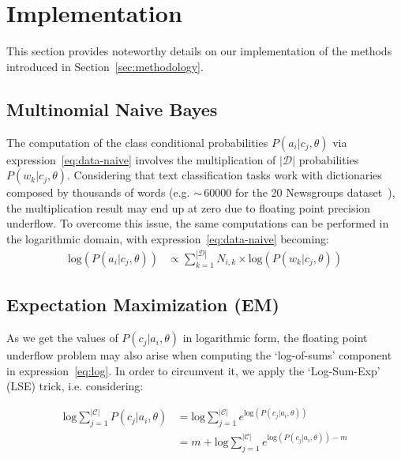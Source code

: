 \section{Implementation}
\label{sec:impl}

This section provides noteworthy details on our implementation of the methods 
introduced in Section~\ref{sec:methodology}.\vertbreak

\subsection{Multinomial Naive Bayes}
\label{subsec:multinomial-naive-impl}

The computation of the class conditional probabilities $P(a_i|c_j,\theta)$ via 
expression~\ref{eq:data-naive} involves the 
multiplication of $|\mathcal{D}|$ probabilities $P(w_{k}|c_j,\theta)$. 
Considering that text classification tasks work with dictionaries 
composed by thousands of words (e.g. $\sim$\,60000 for the 20 Newsgroups 
dataset~\cite{Lang95}), the multiplication result may end up at zero due to 
floating point precision underflow. To overcome this issue, the same 
computations can be performed in the logarithmic domain, with 
expression~\ref{eq:data-naive} becoming:
\begin{equation}
\begin{split}
    \text{log}(P(a_i|c_j,\theta)) &\propto \sum_{k=1}^{|\mathcal{D}|}N_{i,k} \times \text{log}(P(w_{k}|c_j,\theta))
    \label{eq:data-naive-log}
\end{split}
\end{equation}

\subsection{Expectation Maximization (EM)}
\label{subsec:em-impl}

As we get the values of $P(c_j|a_i,\theta)$ in logarithmic form, the floating 
point underflow problem may also arise when computing the 
`log-of-sums' component in expression~\ref{eq:log}. In order to circumvent it, 
we apply the `Log-Sum-Exp' (LSE) trick, i.e. considering:

\begin{equation}
\begin{split}
    \text{log}\sum_{j=1}^{|\mathcal{C}|}P(c_j|a_i,\theta) &= \text{log}\sum_{j=1}^{|\mathcal{C}|}e^{\text{log}(P(c_j|a_i,\theta))}\\
    &= m + \text{log}\sum_{j=1}^{|\mathcal{C}|}e^{\text{log}(P(c_j|a_i,\theta)) - m}
    \label{eq:log-sum-exp}
\end{split}
\end{equation}

